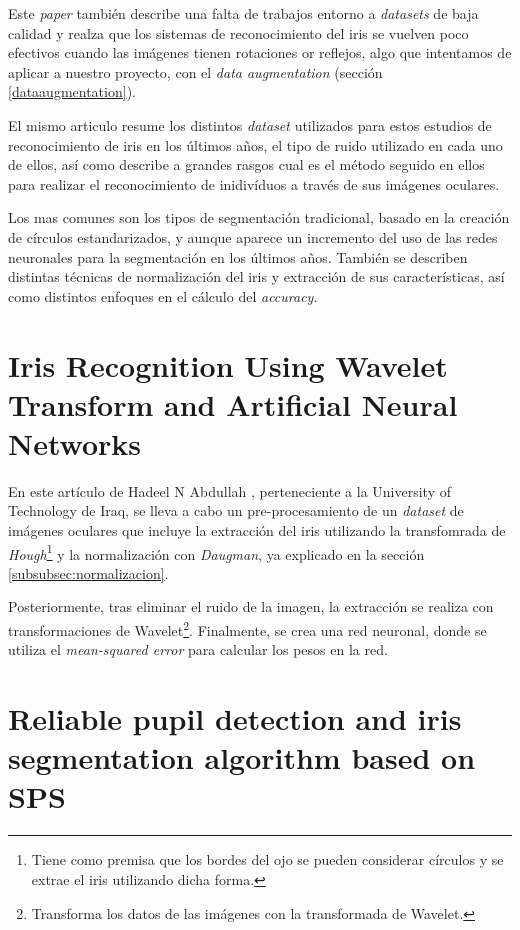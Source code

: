  Este \textit{paper} también describe una falta de trabajos entorno a \textit{datasets} de baja calidad y realza que los sistemas de reconocimiento del iris se vuelven 
 poco efectivos cuando las imágenes tienen rotaciones or reflejos, algo que intentamos de aplicar a nuestro proyecto, con el \textit{data augmentation} (sección \ref{dataaugmentation}).

 El mismo articulo resume los distintos \textit{dataset} utilizados para estos estudios de reconocimiento de iris en los últimos años, el tipo de ruido utilizado en cada uno de ellos,
 así como describe a grandes rasgos cual es el método seguido en ellos para realizar el reconocimiento de inidivíduos a través de sus imágenes oculares.
 
 Los mas comunes son los tipos de segmentación tradicional, basado en la creación de círculos estandarizados, y aunque aparece un incremento del uso de las redes neuronales para la segmentación en los últimos años.
 También se describen distintas técnicas de normalización del iris y extracción de sus características, así como distintos enfoques en el cálculo del \textit{accuracy}.

\section{Iris Recognition Using Wavelet Transform and Artificial Neural Networks}

En este artículo de Hadeel N Abdullah \cite{abdullah_iris_2015}, perteneciente a la University of Technology de Iraq, se lleva a cabo un pre-procesamiento de un \textit{dataset} de imágenes oculares que incluye la extracción 
del iris utilizando la transfomrada de \textit{Hough}\footnote{Tiene como premisa que los bordes del ojo se pueden considerar círculos y se extrae el iris utilizando dicha forma.} y la normalización con \textit{Daugman}, ya explicado en la sección \ref{subsubsec:normalizacion}. 

Posteriormente, tras eliminar el ruido de la imagen, la extracción se realiza con transformaciones de Wavelet\footnote{Transforma los datos de las imágenes con la transformada de Wavelet.}. Finalmente, se crea una red neuronal, donde se utiliza el \textit{mean-squared error} para calcular los pesos en la red.

\section{Reliable pupil detection and iris segmentation algorithm based on SPS}

